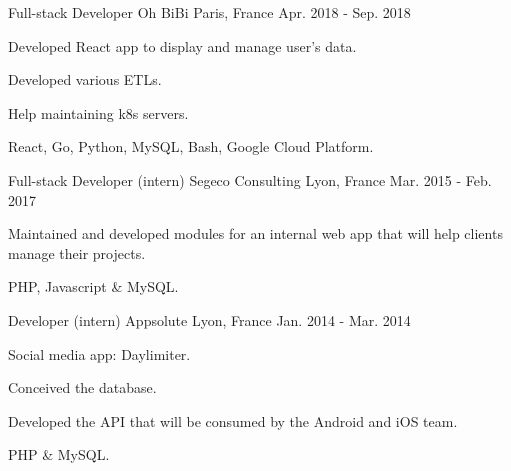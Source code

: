 

\begin{cventries}

  \cventry
  {Full-stack Developer} %
  {Oh BiBi} %
  {Paris, France} %
  {Apr. 2018 - Sep. 2018} %
    {
      \begin{cvitems} %
      \item {Developed React app to display and manage user's data.}
      \item {Developed various ETLs.}
      \item {Help maintaining k8s servers.}
      \item {React, Go, Python, MySQL, Bash, Google Cloud Platform.}
      \end{cvitems}
    }

  \cventry
  {Full-stack Developer (intern)} %
  {Segeco Consulting} %
  {Lyon, France} %
  {Mar. 2015 - Feb. 2017} %
    {
      \begin{cvitems} %
      \item {Maintained and developed modules for an internal web app that will help clients manage their projects.}
      \item {PHP, Javascript \& MySQL.}
      \end{cvitems}
    }

  \cventry
  {Developer (intern)} %
  {Appsolute} %
  {Lyon, France} %
  {Jan. 2014 - Mar. 2014} %
    {
      \begin{cvitems} %
      \item {Social media app: Daylimiter.}
      \item {Conceived the database.}
      \item {Developed the API that will be consumed by the Android and iOS team.}
      \item {PHP \& MySQL.}
      \end{cvitems}
    }


\end{cventries}
